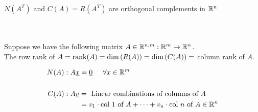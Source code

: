 \begin{theorem}
$N(A^T)$ and $C(A) = R(A^T)$ are orthogonal complements in $\mathbb{R}^n$
\end{theorem} \\ \\
Suppose we have the following matrix $A\in\mathbb{R}^{n,m}:\mathbb{R}^m\to\mathbb{R}^n$. \\  
The row rank of $A = \operatorname{rank}(A) = \dim\left( R(A) \right) =  \dim\left( C(A) \right) = $ column rank of $A$.
 
\begin{align*}
N(A) &:A\underline{x} = \underline{0}\hspace{5mm}\forall x\in\mathbb{R}^m\\ \\
C(A) &: A\underline{v} = \text{ Linear combinations of columns of $A$}\\
&\hspace{7.5mm}= v_1\cdot\text{col 1 of $A$}+\dots+v_n\cdot\text{col $n$ of $A$}\in \mathbb{R}^n
\end{align*}

